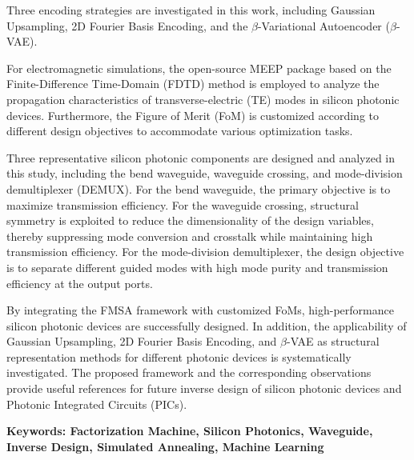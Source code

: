 Three encoding strategies are investigated in this work, including Gaussian Upsampling, 2D Fourier Basis Encoding, and the $\beta$-Variational Autoencoder ($\beta$-VAE).

For electromagnetic simulations, the open-source MEEP package based on the Finite-Difference Time-Domain (FDTD) method is employed to analyze the propagation characteristics of transverse-electric (TE) modes in silicon photonic devices. Furthermore, the Figure of Merit (FoM) is customized according to different design objectives to accommodate various optimization tasks.

Three representative silicon photonic components are designed and analyzed in this study, including the bend waveguide, waveguide crossing, and mode-division demultiplexer (DEMUX). For the bend waveguide, the primary objective is to maximize transmission efficiency. For the waveguide crossing, structural symmetry is exploited to reduce the dimensionality of the design variables, thereby suppressing mode conversion and crosstalk while maintaining high transmission efficiency. For the mode-division demultiplexer, the design objective is to separate different guided modes with high mode purity and transmission efficiency at the output ports.

By integrating the FMSA framework with customized FoMs, high-performance silicon photonic devices are successfully designed. In addition, the applicability of Gaussian Upsampling, 2D Fourier Basis Encoding, and $\beta$-VAE as structural representation methods for different photonic devices is systematically investigated. The proposed framework and the corresponding observations provide useful references for future inverse design of silicon photonic devices and Photonic Integrated Circuits (PICs).


\vspace{1cm}

\textbf{Keywords: Factorization Machine, Silicon Photonics, Waveguide, Inverse Design, Simulated Annealing, Machine Learning} 
